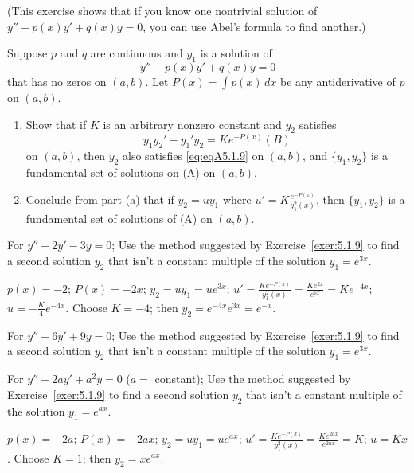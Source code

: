 \documentclass{ximera}
\begin{document}
\begin{problem}\label{exer:5.1.9}  %
(This exercise shows that if you know one
nontrivial solution of $y''+p(x)y'+q(x)y=0$, you can use Abel's
formula to find another.)

Suppose $p$ and $q$ are continuous and $y_1$ is a solution
of
\begin{equation}\label{eq:eqA5.1.9}
y''+p(x)y'+q(x)y=0
\end{equation}
that has no zeros  on  $(a,b)$.
Let $P(x)=\int p(x)\,dx$ be any
antiderivative of $p$ on  $(a,b)$.
\begin{enumerate}
\item %
Show that if $K$ is an arbitrary nonzero constant and
$y_2$  satisfies
$$
y_1y_2'-y_1'y_2=Ke^{-P(x)}
(B)
$$
on $(a,b)$, then $y_2$ also satisfies \ref{eq:eqA5.1.9}
on $(a,b)$, and $\{y_1,y_2\}$ is a fundamental set of solutions on
(A) on $(a,b)$.

\item %
Conclude from part (a) that if $y_2=uy_1$ where
$u'=K\frac{e^{-P(x)}}{y_1^2(x)}$, then  $\{y_1,y_2\}$
is a fundamental set of solutions of (A)
on  $(a,b)$.
\end{enumerate}
\end{problem}

\begin{problem}\label{exer:5.1.10}
For $y''-2y'-3y=0$; Use the
method suggested by Exercise~\ref{exer:5.1.9} to find a second solution
$y_2$  that isn't  a constant multiple of the  solution $y_1=e^{3x}$.

\begin{solution}
    $p(x)=-2$;\;
$P(x)=-2x$;\;
$y_2=uy_1=ue^{3x}$;\;
$u'=\frac{Ke^{-P(x)}}{ y_1^2(x)}=\frac{Ke^{2x}}{
e^{6x}}=Ke^{-4x}$;\;
$u=-\frac{K}{4}e^{-4x}$.
Choose $K=-4$;  then
$y_2=e^{-4x}e^{3x}=e^{-x}$.
\end{solution}
\end{problem}

\begin{problem}\label{exer:5.1.11}
For $y''-6y'+9y=0$; Use the
method suggested by Exercise~\ref{exer:5.1.9} to find a second solution
$y_2$  that isn't  a constant multiple of the  solution $y_1=e^{3x}$.
\end{problem}

\begin{problem}\label{exer:5.1.12}%
For $y''-2ay'+a^2y=0$\; ($a=$ constant); Use the
method suggested by Exercise~\ref{exer:5.1.9} to find a second solution
$y_2$  that isn't  a constant multiple of the  solution $y_1=e^{ax}$.

\begin{solution}
    $p(x)=-2a$;\;
$P(x)=-2ax$;\;
$y_2=uy_1=ue^{ax}$;\;
$u'=\frac{Ke^{-P(x)}}{ y_1^2(x)}=\frac{Ke^{2ax}}{ e^{2ax}}=K$;\;
$u=Kx$.
Choose $K=1$; then
$y_2=xe^{ax}$.
\end{solution}
\end{problem}
\end{document}
